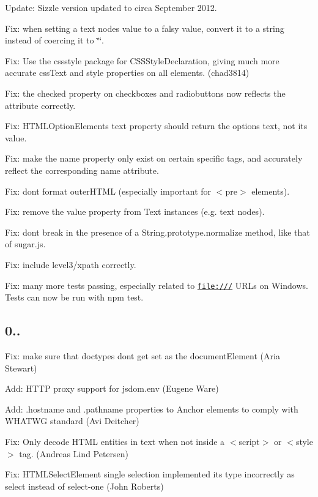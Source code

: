 \begin{DoxyItemize}
\item Update\+: Sizzle version updated to circa September 2012.
\item Fix\+: when setting a text node\textquotesingle{}s value to a falsy value, convert it to a string instead of coercing it to {\ttfamily \char`\"{}\char`\"{}}.
\item Fix\+: Use the cssstyle package for {\ttfamily C\+S\+S\+Style\+Declaration}, giving much more accurate {\ttfamily css\+Text} and {\ttfamily style} properties on all elements. (chad3814)
\item Fix\+: the {\ttfamily checked} property on checkboxes and radiobuttons now reflects the attribute correctly.
\item Fix\+: {\ttfamily H\+T\+M\+L\+Option\+Element}\textquotesingle{}s {\ttfamily text} property should return the option\textquotesingle{}s text, not its value.
\item Fix\+: make the {\ttfamily name} property only exist on certain specific tags, and accurately reflect the corresponding {\ttfamily name} attribute.
\item Fix\+: don\textquotesingle{}t format {\ttfamily outer\+H\+T\+ML} (especially important for {\ttfamily $<$pre$>$} elements).
\item Fix\+: remove the {\ttfamily value} property from {\ttfamily Text} instances (e.\+g. text nodes).
\item Fix\+: don\textquotesingle{}t break in the presence of a {\ttfamily String.\+prototype.\+normalize} method, like that of sugar.\+js.
\item Fix\+: include level3/xpath correctly.
\item Fix\+: many more tests passing, especially related to \href{file:///}{\tt file\+:///} U\+R\+Ls on Windows. Tests can now be run with {\ttfamily npm test}.
\end{DoxyItemize}

\subsection*{0..}


\begin{DoxyItemize}
\item Fix\+: make sure that doctypes don\textquotesingle{}t get set as the document\+Element (Aria Stewart)
\item Add\+: H\+T\+TP proxy support for jsdom.\+env (Eugene Ware)
\item Add\+: .hostname and .pathname properties to Anchor elements to comply with W\+H\+A\+T\+WG standard (Avi Deitcher)
\item Fix\+: Only decode H\+T\+ML entities in text when not inside a {\ttfamily $<$script$>$} or {\ttfamily $<$style$>$} tag. (Andreas Lind Petersen)
\item Fix\+: H\+T\+M\+L\+Select\+Element single selection implemented its type incorrectly as \textquotesingle{}select\textquotesingle{} instead of \textquotesingle{}select-\/one\textquotesingle{} (John Roberts)
\end{DoxyItemize}

